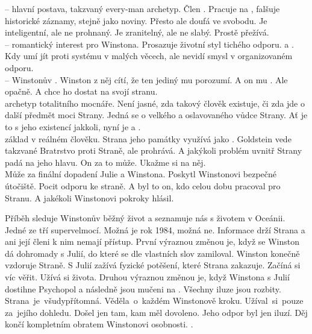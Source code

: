 \documentclass[FGBook.tex]{subfiles}
\begin{document}
\noindent
{} -- hlavní postava, takzvaný every-man archetyp.
Člen .
Pracuje na , falšuje historické záznamy, stejně jako noviny.
Přesto ale doufá ve svobodu.
Je inteligentní, ale ne prohnaný.
Je zranitelný, ale ne slabý.
Prostě přežívá.\\
 -- romantický interest pro Winstona.
Prosazuje životní styl tichého odporu.
 a .
Kdy umí jít proti systému v malých věcech, ale nevidí smysl v organizovaném odporu.
\\
 -- Winstonův .
Winston z něj cítí, že ten jediný mu porozumí.
A on mu .
Ale opačně.
A chce ho dostat na svojí stranu.\\
 archetyp totalitního mocnáře.
Není jasné, zda takový člověk existuje, či zda jde o další předmět moci Strany.
Jedná se o velkého a oslavovaného vůdce Strany.
Ať je to s jeho existencí jakkoli, nyní je  a .\\
 základ v reálném člověku.
Strana jeho památky využívá jako .
Goldstein vede takzvané Bratrstvo proti Straně, ale prohrává.
A jakýkoli problém uvnitř Strany padá na jeho hlavu.
On za to může.
Ukažme si na něj.\\
 Může za finální dopadení Julie a Winstona.
Poskytl Winstonovi bezpečné útočiště.
Pocit odporu ke straně.
A byl to on, kdo celou dobu pracoval pro Stranu.
A jakékoli Winstonovi pokroky hlásil.

Příběh sleduje Winstonův běžný život a seznamuje nás s životem v Oceánii.
Jedné ze tří supervelmocí.
Možná je rok 1984, možná ne.
Informace drží Strana a ani její členi k nim nemají přístup.
První výraznou změnou je, když se Winston dá dohromady s Julií, do které se dle vlastních slov zamiloval.
Winston konečně vzdoruje Straně.
S Julií zažívá fyzické potěšení, které Strana zakazuje.
Začíná si víc věřit.
Užívá si života.
Druhou výraznou změnou je, když Winstona s Julií dostihne Psychopol a následně jsou mučeni na .
Všechny iluze jsou rozbity.
Strana~je~všudypřítomná.
Věděla~o~každém Winstonově kroku.
Užíval~si~pouze za~jejího dohledu.
Došel jen tam, kam měl dovoleno.
Jeho odpor byl jen iluzí.
Děj končí kompletním obratem Winstonovi osobnosti.
.
\end{document}
